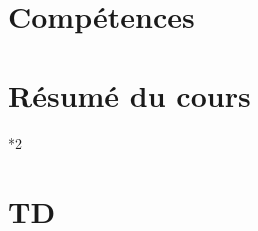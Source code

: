 \documentclass{poly}
\begin{document}
\maketitle{}

\part{Compétences}


\clearpage \part{Résumé du cours}
\begin{paracol}[1]*{2}
    \begin{leftcolumn}
    
    \end{leftcolumn}
    \begin{rightcolumn}
    \end{rightcolumn}
\end{paracol}

\clearpage {}

% 

\part{TD}

\end{document}

